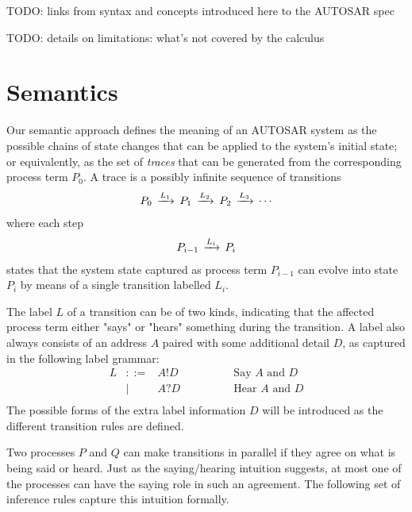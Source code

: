 \documentclass[twocolumn]{article}
\begin{document}
TODO: links from syntax and concepts introduced here to the AUTOSAR spec

TODO: details on limitations: what's not covered by the calculus

\section{Semantics}
\label{sec:Sem}

Our semantic approach defines the meaning of an AUTOSAR system as the possible chains of state changes that can be applied to the system's initial state; or equivalently, as the set of \emph{traces} that can be generated from the corresponding process term $P_0$. A trace is a possibly infinite sequence of transitions
\[
\begin{array}{c}
	P_0 \,\xrightarrow{L_1}\, P_1 \,\xrightarrow{L_2}\, P_2 \,\xrightarrow{L_3}\, \cdots
\end{array}
\]
where each step
\[
\begin{array}{c}
	P_{i-1} \,\xrightarrow{L_i}\, P_i
\end{array}
\]
states that the system state captured as process term $P_{i-1}$ can evolve into state $P_i$ by means of a single transition labelled $L_i$.


The label $L$ of a transition can be of two kinds, indicating that the affected process term either "says" or "hears" something during the transition. A label also always consists of an address $A$ paired with some additional detail $D$, as captured in the following label grammar:
\[
\begin{array}{rcll}
	L	& ::=		& A!D		& \hspace{4em}\text{Say $A$ and $D$} \\
		&	|	& A?D		& \hspace{4em}\text{Hear $A$ and $D$} \\
\end{array}
\]
The possible forms of the extra label information $D$ will be introduced as the different transition rules are defined.

Two processes $P$ and $Q$ can make transitions in parallel if they agree on what is being said or heard. Just as the saying/hearing intuition suggests, at most one of the processes can have the saying role in such an agreement. The following set of inference rules capture this intuition formally.
\end{document}
